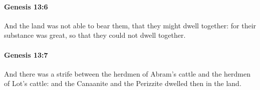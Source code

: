 		\paragraph{Genesis 13:6} %
			\label{GENESIS-13-6}

			And the land was not able to bear them, that they might dwell together: for their substance was great, so that they could not dwell together.


		\paragraph{Genesis 13:7} %
			\label{GENESIS-13-7}

			And there was a strife between the herdmen of Abram's cattle and the herdmen of Lot's cattle: and the Canaanite and the Perizzite dwelled then in the land.


